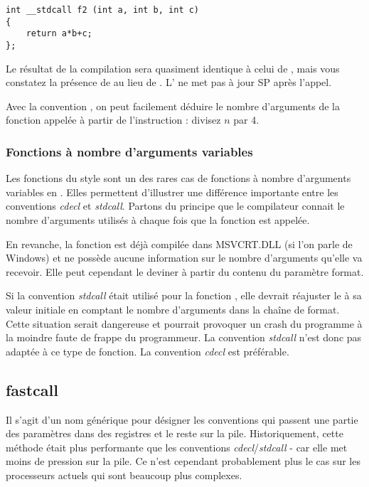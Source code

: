 \begin{lstlisting}[style=customc]
int __stdcall f2 (int a, int b, int c)
{
	return a*b+c;
};
\end{lstlisting}

Le résultat de la compilation sera quasiment identique à celui de ,
mais vous constatez la présence de  au lieu de .
L'  ne met pas à jour {SP} après l'appel.

Avec la convention , on peut facilement déduire le nombre d'arguments de la fonction
appelée à partir de l'instruction : divisez $n$ par 4.



\subsubsection{Fonctions à nombre d'arguments variables}

Les fonctions du style \printf sont un des rares cas de fonctions à nombre d'arguments variables
en \CCpp. Elles permettent d'illustrer une différence importante entre les conventions \emph{cdecl} et \emph{stdcall}.
Partons du principe que le compilateur connait le nombre d'arguments utilisés à chaque fois que la
fonction \printf est appelée.

En revanche, la fonction \printf est déjà compilée dans MSVCRT.DLL (si l'on parle de Windows) et ne
possède aucune information sur le nombre d'arguments qu'elle va recevoir. Elle peut cependant le
deviner à partir du contenu du paramètre format.

Si la convention \emph{stdcall} était utilisé pour la fonction \printf, elle devrait réajuster le
 à sa valeur initiale en comptant le nombre d'arguments dans la chaîne de format.
Cette situation serait dangereuse et pourrait provoquer un crash du programme à la moindre faute de
frappe du programmeur.
La convention \emph{stdcall} n'est donc pas adaptée à ce type de fonction. La convention \emph{cdecl} est préférable.

\subsection{fastcall}
\label{fastcall}

Il s'agit d'un nom générique pour désigner les conventions qui passent une partie des paramètres dans
des registres et le reste sur la pile.
Historiquement, cette méthode était plus performante que les conventions \emph{cdecl}/\emph{stdcall} -
car elle met moins de pression sur la pile. Ce n'est cependant probablement plus le cas sur les
processeurs actuels qui sont beaucoup plus complexes.

